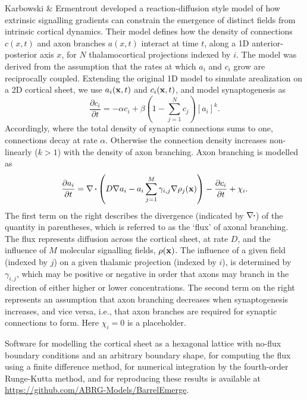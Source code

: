 \documentclass[9pt,twocolumn,twoside,lineno]{pnas-new}
\begin{document}
Karbowski \& Ermentrout \citep{karbowski_model_2004} developed a reaction-diffusion style model of how extrinsic signalling gradients can constrain the emergence of distinct fields from intrinsic cortical dynamics. Their model defines how the density of connections $c(x,t)$ and axon branches $a(x,t)$ interact at time $t$, along a 1D anterior-posterior axis $x$, for $N$ thalamocortical projections indexed by $i$. The model was derived from the assumption that the rates at which $a_i$ and $c_i$ grow are reciprocally coupled. Extending the original 1D model to simulate arealization on a 2D cortical sheet, we use $a_i(\mathbf{x},t)$ and $c_i(\mathbf{x},t)$, and model synaptogenesis as
%
\begin{equation} \label{eq:dc}
\frac{\partial c_i}{\partial t} =-\alpha c_i +\beta  \left(1 - \sum_{j=1}^{N} c_{j}\right)[a_i]^k.
\end{equation}
%
Accordingly, where the total density of synaptic connections sums to one, connections decay at rate $\alpha$. Otherwise the connection density increases non-linearly ($k>1$) with the density of axon branching. Axon branching is modelled as
%
\begin{equation} \label{eq:da}
\frac{\partial a_i}{\partial t} = \nabla\vcdot\left(D \nabla a_i-a_i\sum_{j=1}^{M} \gamma_{i,j}\nabla \rho_j(\mb{x})\right) - \frac{\partial c_i}{\partial t} + \chi_i.
\end{equation}
%
The first term on the right describes the divergence (indicated by $\nabla\vcdot$) of the quantity in parentheses, which is referred to as the `flux' of axonal branching. The flux represents diffusion across the cortical sheet, at rate $D$, and the influence of $M$ molecular signalling fields, $\rho(\mathbf{x})$. The influence of a given field (indexed by $j$) on a given thalamic projection (indexed by $i$), is determined by $\gamma_{i,j}$, which may be positive or negative in order that axons may branch in the direction of either higher or lower  concentrations. The second term on the right represents an assumption that axon branching decreases when synaptogenesis increases, and vice versa, i.e., that axon branches are required for synaptic connections to form. Here $\chi_i=0$ is a placeholder.

Software for modelling the cortical sheet as a hexagonal lattice with no-flux
boundary conditions and an arbitrary boundary shape, for computing the flux
using a finite difference method, for numerical integration by the
fourth-order Runge-Kutta method, and for reproducing these results is available at \url{https://github.com/ABRG-Models/BarrelEmerge}.
\end{document}
